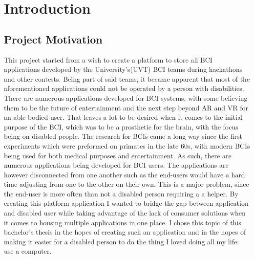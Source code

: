 \pagestyle{fancy}
\fancyhf{}%
\fancyhead[RO,LE]{\thepage}%
\fancyhead[RE]{\nouppercase{\leftmark}}%
\renewcommand{\headrulewidth}{0pt}%


\chapter{Introduction}\label{cap:intro}



\section{Project Motivation}\label{sect:motivation}
This project started from a wish to create a platform to store all BCI applications developed by the University's(UVT) BCI teams during hackathons and other contests. Being part of said teams, it became apparent that most of the aforementioned applications could not be operated by a person with disabilities.
\vspace{\baselineskip}\newline
There are numerous applications developed for BCI systems, with some believing them to be the future of entertainment and the next step beyond AR and VR for an able-bodied user\cite{future_of_metaverse_BCI}. That leaves a lot to be desired when it comes to the initial purpose of the BCI, which was to be a prosthetic for the brain, with the focus being on disabled people. The research for BCIs came a long way since the first experiments which were preformed on primates in the late 60s\cite{Fetz_1969}, with modern BCIs being used for both medical purposes and entertainment. 
\vspace{\baselineskip}\newline
As such, there are numerous applications being developed for BCI users. The applications are however disconnected from one another such as the end-users would have a hard time adjusting from one to the other on their own. This is a major problem, since the end-user is more often than not a disabled person requiring a a helper. By creating this platform application I wanted to bridge the gap between application and disabled user while taking advantage of the lack of consumer solutions when it comes to housing multiple applications in one place. I chose this topic of this bachelor's thesis in the hopes of creating such an application and in the hopes of making it easier for a disabled person to do the thing I loved doing all my life: use a computer.



